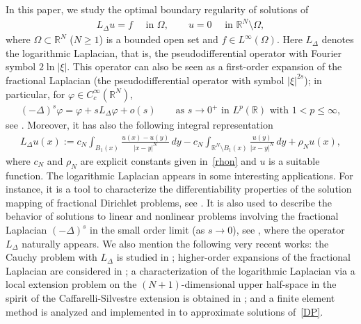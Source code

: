 \documentclass[11pt]{article}
\newcommand{\R}{\mathbb{R}}
\numberwithin{equation}{section}
\begin{document}
In this paper, we study the optimal boundary regularity of solutions of
\begin{align}\label{DP}
    L_\Delta u = f\quad \text{ in }\Omega,\qquad u=0\quad \text{ in }\R^N \setminus \Omega,
\end{align}
where $\Omega\subset \R^N$ ($N\geq 1$) is a bounded open set and $f\in L^\infty(\Omega)$.  Here $L_\Delta$ denotes the logarithmic Laplacian, that is, the pseudodifferential operator with Fourier symbol $2\ln|\xi|$.  This operator can also be seen as a first-order expansion of the fractional Laplacian (the pseudodifferential operator with symbol $|\xi|^{2s}$); in particular, for $\varphi\in C^\infty_c(\R^N)$,
\begin{align*}%
(-\Delta)^s\varphi = \varphi + sL_\Delta \varphi + o(s)\qquad \text{as $s\to 0^+$ in }L^p(\R) \text{ with }1<p\leq \infty,
\end{align*}
see \cite[Theorem 1.1]{CW19}.  Moreover, it has also the following integral representation
\begin{align}\label{loglap:def}
L_{\Delta}u(x):=c_{N}\int_{B_{1}(x)}\frac{u(x)-u(y)}{|x-y|^{N}}\, dy-c_{N}\int_{\mathbb{R}^{N}\setminus B_{1}(x)}\frac{u(y)}{|x-y|^{N}}\, dy+\rho_{N}u(x),
\end{align}
where $c_N$ and $\rho_N$ are explicit constants given in~\eqref{rhon} and $u$ is a suitable function.  The logarithmic Laplacian appears in some interesting applications.  For instance, it is a tool to characterize the differentiability properties of the solution mapping of fractional Dirichlet problems, see \cite{JSW20,JSW23}.  It is also used to describe the behavior of solutions to linear and nonlinear problems involving the fractional Laplacian $(-\Delta)^s$ in the small order limit (as $s\to 0$), see \cite{FJW22,AS22,hernandez2022small}, where the operator $L_\Delta$ naturally appears.  We also mention the following very recent works: the Cauchy problem with $L_\Delta$ is studied in \cite{chen2023cauchy}; higher-order expansions of the fractional Laplacian are considered in \cite{chen2023taylor}; a characterization of the logarithmic Laplacian via a local extension problem on the $(N+1)$-dimensional upper half-space in the spirit of the Caffarelli-Silvestre extension is obtained in \cite{CHW23}; and a finite element method is analyzed and implemented in \cite{HJSS23} to approximate solutions of~\eqref{DP}.
\end{document}
